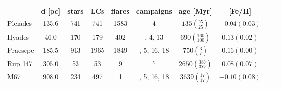 \begin{tabular}{lccccccccr}
\hline\hline
          &  d [pc] &  stars &   LCs &  flares &    campaigns &                        age [Myr] &         [Fe/H] \\
\hline
 Pleiades &   135.6 &    741 &   741 &    1583 &            4 &     $135\left(_{25}^{25}\right)$ &  $-0.04(0.03)$ \\
   Hyades &    46.0 &    170 &   179 &     402 &      , 4, 13 &   $690\left(_{100}^{160}\right)$ &   $0.13(0.02)$ \\
 Praesepe &   185.5 &    913 &  1965 &    1849 &  , 5, 16, 18 &       $750\left(_{7}^{3}\right)$ &   $0.16(0.00)$ \\
  Rup 147 &   305.0 &     53 &    53 &       9 &            7 &  $2650\left(_{380}^{380}\right)$ &   $0.08(0.07)$ \\
      M67 &   908.0 &    234 &   497 &       1 &  , 5, 16, 18 &    $3639\left(_{17}^{17}\right)$ &  $-0.10(0.08)$ \\
\hline

\end{tabular}
